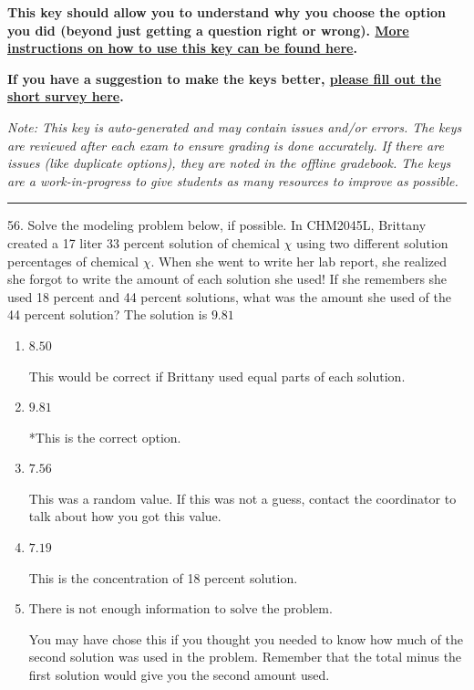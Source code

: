 \documentclass{extbook}[14pt]
\begin{document}
\textbf{This key should allow you to understand why you choose the option you did (beyond just getting a question right or wrong). \href{https://xronos.clas.ufl.edu/mac1105spring2020/courseDescriptionAndMisc/Exams/LearningFromResults}{More instructions on how to use this key can be found here}.}

\textbf{If you have a suggestion to make the keys better, \href{https://forms.gle/CZkbZmPbC9XALEE88}{please fill out the short survey here}.}

\textit{Note: This key is auto-generated and may contain issues and/or errors. The keys are reviewed after each exam to ensure grading is done accurately. If there are issues (like duplicate options), they are noted in the offline gradebook. The keys are a work-in-progress to give students as many resources to improve as possible.}

\rule{\textwidth}{0.4pt}

56. Solve the modeling problem below, if possible.
In CHM2045L, Brittany created a 17 liter 33 percent solution of chemical $\chi$ using two different solution percentages of chemical $\chi$. When she went to write her lab report, she realized she forgot to write the amount of each solution she used! If she remembers she used 18 percent and 44 percent solutions, what was the amount she used of the 44 percent solution? 
The solution is $ 9.81 $ 

\begin{enumerate}[label=\Alph*.] 
\item $ 8.50 $ 

 This would be correct if Brittany used equal parts of each solution. 
\item $ 9.81 $ 

 *This is the correct option. 
\item $ 7.56 $ 

 This was a random value. If this was not a guess, contact the coordinator to talk about how you got this value. 
\item $ 7.19 $ 

 This is the concentration of 18 percent solution. 
\item $ \text{There is not enough information to solve the problem.} $ 

 You may have chose this if you thought you needed to know how much of the second solution was used in the problem. Remember that the total minus the first solution would give you the second amount used. 
\end{enumerate} 
 
\end{document}
